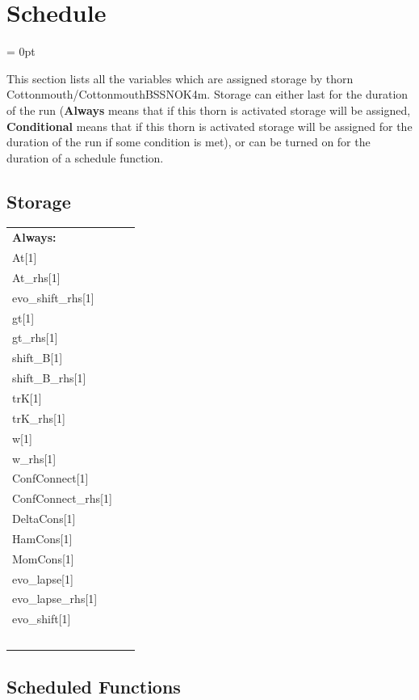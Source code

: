 
\section{Schedule} 


\parskip = 0pt


\noindent This section lists all the variables which are assigned storage by thorn Cottonmouth/CottonmouthBSSNOK4m.  Storage can either last for the duration of the run ({\bf Always} means that if this thorn is activated storage will be assigned, {\bf Conditional} means that if this thorn is activated storage will be assigned for the duration of the run if some condition is met), or can be turned on for the duration of a schedule function.


\subsection*{Storage}

\hspace{5mm}

 \begin{tabular*}{160mm}{ll} 

{\bf Always:}&  ~ \\ 
 At[1] & ~\\ 
 At\_rhs[1] & ~\\ 
 evo\_shift\_rhs[1] & ~\\ 
 gt[1] & ~\\ 
 gt\_rhs[1] & ~\\ 
 shift\_B[1] & ~\\ 
 shift\_B\_rhs[1] & ~\\ 
 trK[1] & ~\\ 
 trK\_rhs[1] & ~\\ 
 w[1] & ~\\ 
 w\_rhs[1] & ~\\ 
 ConfConnect[1] & ~\\ 
 ConfConnect\_rhs[1] & ~\\ 
 DeltaCons[1] & ~\\ 
 HamCons[1] & ~\\ 
 MomCons[1] & ~\\ 
 evo\_lapse[1] & ~\\ 
 evo\_lapse\_rhs[1] & ~\\ 
 evo\_shift[1] & ~\\ 
~ & ~\\ 
\end{tabular*} 


\subsection*{Scheduled Functions}
\vspace{5mm}

